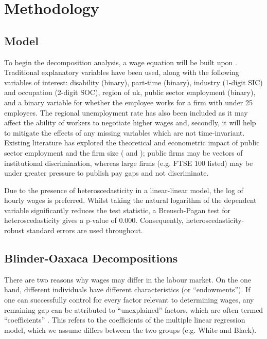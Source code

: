 \documentclass[class=article, crop=false]{standalone}
\begin{document}
\section{Methodology}
\label{sec:Methodology}
\subsection{Model}
\label{sec:Model}
To begin the decomposition analysis, a wage equation will be built upon \citet{MincerA}. Traditional explanatory variables have been used, along with the following variables of interest: disability (binary), part-time (binary), industry (1-digit SIC) and occupation (2-digit SOC), region of \acrshort{uk}, public sector employment (binary), and a binary variable for whether the employee works for a firm with under 25 employees. The regional unemployment rate has also been included as it may affect the ability of workers to negotiate higher wages \citep{Bell} and, secondly, it will help to mitigate the effects of any missing variables which are not time-invariant. Existing literature has explored the theoretical and econometric impact of public sector employment and the firm size (\citet{Longhi} and \citet{Longhi3}); public firms may be vectors of institutional discrimination, whereas large firms (e.g. FTSE 100 listed) may be under greater pressure to publish pay gaps and not discriminate. %

Due to the presence of heteroscedasticity in a linear-linear model, the log of hourly wages is preferred. Whilst taking the natural logarithm of the dependent variable significantly reduces the test statistic, a Breusch-Pagan test for heteroscedasticity gives a p-value of 0.000. Consequently, heteroscedasticity-robust standard errors are used throughout.

\subsection{Blinder-Oaxaca Decompositions}
\label{sec:B_O_Decomp}
There are two reasons why wages may differ in the labour market. On the one hand, different individuals have different characteristics (or \enquote{endowments}). If one can successfully control for every factor relevant to determining wages, any remaining gap can be attributed to \enquote{unexplained} factors, which are often termed \enquote{coefficients} \citep{Blinder}. This refers to the coefficients of the multiple linear regression model, which we assume differs between the two groups (e.g. White and Black). %
\end{document}

